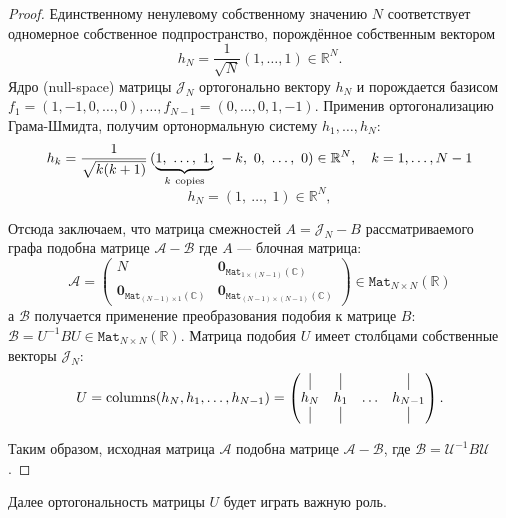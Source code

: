 \documentclass[14pt,a4paper]{extarticle}
\numberwithin{equation}{section}
\theoremstyle{definition}
\begin{document}
\begin{proof}
  Единственному ненулевому собственному значению \( N \) соответствует
  одномерное собственное подпространство, порождённое собственным вектором
  \[
    h_N = \frac{1}{\sqrt{N}} \left(1, \ldots, 1\right)\in\mathbb{R}^N.
  \]
  Ядро (null-space) матрицы \( \mathcal{J}_N \) ортогонально вектору \( h_N \)
  и порождается базисом
  \( f_1 = {\left(1,-1,0,\ldots,0\right)}, \ldots,
     f_{N-1} = {\left(0,\ldots,0,1,-1\right)}. \)
  Применив ортогонализацию Грама-Шмидта, получим ортонормальную систему \( h_1, \ldots, h_N \):
    \[
        h_k = \frac{1}{\sqrt{k(k+1)}}
            \left(\smash{\underbrace{1,~\ldots,~1,}_{k\ \text{copies}}}~-k,~0,~\ldots,~0\right)
            \in \mathbb{R}^N, \quad k={1, \ldots, N-1} \]
    \[
        h_N = {\left(1,~\ldots,~1\right)} \in \mathbb{R}^N, \]

Отсюда заключаем, что матрица смежностей \( A = \mathcal{J}_N - B \)
рассматриваемого графа подобна матрице
    \( \mathcal{A} - \mathcal{B} \)
    где \( A \) --- блочная матрица:
    \[
        \mathcal{A} = \left(\begin{array}{c|c}
        N & \mathbf{0}_{\mathtt{Mat}_{1{\times}(N{-}1)}(\mathbb{C})}\\ \hline
            \mathbf{0}_{\mathtt{Mat}_{(N{-}1){\times}1}(\mathbb{C})} & \mathbf{0}_{\mathtt{Mat}_{(N{-}1){\times}(N{-}1)}(\mathbb{C})}
        \end{array}\right) \in \mathtt{Mat}_{N{\times}N}(\mathbb{R})
    \]
    а \( \mathcal{B} \) получается применение преобразования подобия к матрице
    \( B \):
    \(
        \mathcal{B} = U^{-1} B U \in \mathtt{Mat}_{N{\times}N}(\mathbb{R}).
    \)
Матрица подобия \( U \) имеет столбцами собственные векторы \( \mathcal{J}_N \):
    \[
        U = \operatorname{columns}(h_N, h_1, \ldots, h_{N-1}) =
        \begin{pmatrix}
            \vline & \vline &        & \vline \\
            h_N    & h_1    & \ldots & h_{N-1} \\
            \vline & \vline &        & \vline

        \end{pmatrix}.
    \]


Таким образом, исходная матрица \( \mathcal{A} \) подобна матрице
\( \mathcal{A} - \mathcal{B} \), где \( \mathcal{B} = \mathcal{U}^{-1} B \mathcal{U} \).
\end{proof}

Далее ортогональность матрицы \( U \) будет играть важную роль.
\end{document}
